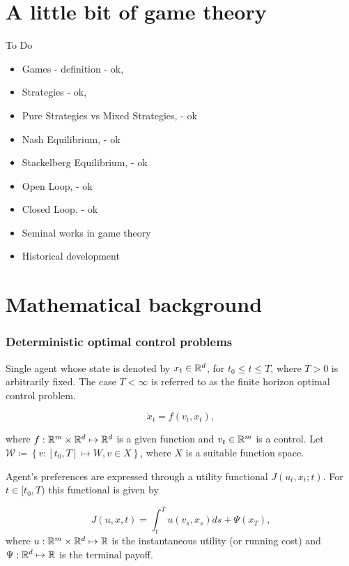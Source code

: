 \documentclass{article}
\begin{document}
\section{A little bit of game theory}\label{appendix-game-theory}
To Do
\begin{itemize}
    \item Games - definition - ok, 
    \item Strategies - ok, 
    \item Pure Strategies vs Mixed Strategies, - ok
    \item Nash Equilibrium, - ok 
    \item Stackelberg Equilibrium,  - ok
    \item Open Loop, - ok
    \item Closed Loop. - ok
    \item Seminal works in game theory
    \item Historical development
\end{itemize}



\section{Mathematical background}\label{appendix-mathematical-background}

\subsubsection{Deterministic optimal control problems}\label{deterministic_optimal_control}

Single agent whose state is denoted by $x_t \in \mathbb{R}^d$, for $t_0 \leq t\leq T$, where $T > 0$ is arbitrarily fixed. The case $T< \infty$ is referred to as the finite horizon optimal control problem.

$$\dot x_t = f(v_t,x_t),$$

where $f: \mathbb{R}^m \times \mathbb{R}^d \mapsto \mathbb{R}^d$ is a given function and $v_t \in \mathbb{R}^m$ is a control. Let $\mathcal{W} \coloneqq \left\{ v : [t_0, T] \mapsto W, v \in X \right\}$, where $X$ is a suitable function space.

Agent's preferences are expressed through a utility functional $J(u_t, x_t; t)$. For $t \in [t_0,T)$ this functional is given by 

$$
J(u,x,t) = \int_t^T u(v_s, x_s) ds + \Psi(x_T),
$$
where $u : \mathbb{R}^m\times \mathbb{R}^d \mapsto \mathbb{R}$ is the instantaneous utility (or running cost) and $\Psi : \mathbb{R}^d \mapsto \mathbb{R}$ is the terminal payoff.
\end{document}
